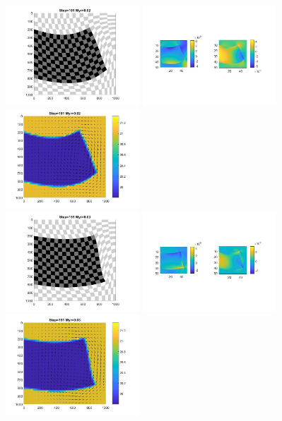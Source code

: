 \begin{center}
\includegraphics[width=5cm]{python_codes/fieldstone_64/results/slab/gerya2/markers_0020_Myr}
\includegraphics[width=5cm]{python_codes/fieldstone_64/results/slab/gerya2/stress_0020_Myr}
\includegraphics[width=5cm]{python_codes/fieldstone_64/results/slab/gerya2/velocity_0020_Myr}\\
\includegraphics[width=5cm]{python_codes/fieldstone_64/results/slab/gerya2/markers_0030_Myr}
\includegraphics[width=5cm]{python_codes/fieldstone_64/results/slab/gerya2/stress_0030_Myr}
\includegraphics[width=5cm]{python_codes/fieldstone_64/results/slab/gerya2/velocity_0030_Myr}\\

\end{center}
